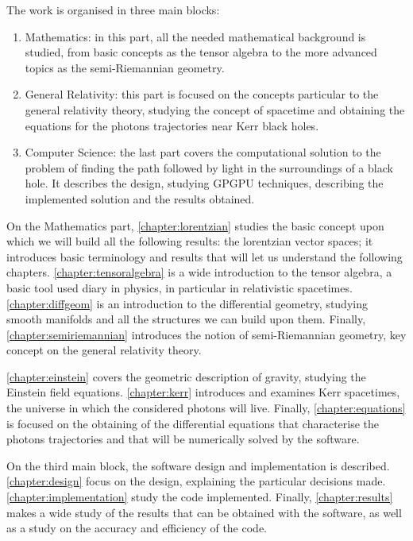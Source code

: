 The work is organised in three main blocks:
\begin{enumerate}
	\item Mathematics: in this part, all the needed mathematical background is studied, from basic concepts as the tensor algebra to the more advanced topics as the semi-Riemannian geometry.
	\item General Relativity: this part is focused on the concepts particular to the general relativity theory, studying the concept of spacetime and obtaining the equations for the photons trajectories near Kerr black holes.
	\item Computer Science: the last part covers the computational solution to the problem of finding the path followed by light in the surroundings of a black hole. It describes the design, studying \ac{GPGPU} techniques, describing the implemented solution and the results obtained.
\end{enumerate}

On the Mathematics part, \autoref{chapter:lorentzian} studies the basic concept upon which we will build all the following results: the lorentzian vector spaces; it introduces basic terminology and results that will let us understand the following chapters. \autoref{chapter:tensoralgebra} is a wide introduction to the tensor algebra, a basic tool used diary in physics, in particular in relativistic spacetimes. \autoref{chapter:diffgeom} is an introduction to the differential geometry, studying smooth manifolds and all the structures we can build upon them. Finally, \autoref{chapter:semiriemannian} introduces the notion of semi-Riemannian geometry, key concept on the general relativity theory.

\autoref{chapter:einstein} covers the geometric description of gravity, studying the Einstein field equations. \autoref{chapter:kerr} introduces and examines Kerr spacetimes, the universe in which the considered photons will live. Finally, \autoref{chapter:equations} is focused on the obtaining of the differential equations that characterise the photons trajectories and that will be numerically solved by the software.

On the third main block, the software design and implementation is described. \autoref{chapter:design} focus on the design, explaining the particular decisions made. \autoref{chapter:implementation} study the code implemented. Finally, \autoref{chapter:results} makes a wide study of the results that can be obtained with the software, as well as a study on the accuracy and efficiency of the code.